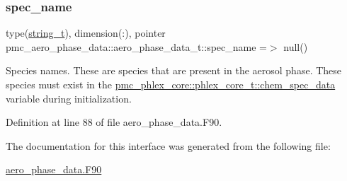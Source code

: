 \subsubsection{\texorpdfstring{spec\+\_\+name}{spec\_name}}
{\footnotesize\ttfamily type(\mbox{\hyperlink{structpmc__util_1_1string__t}{string\+\_\+t}}), dimension(\+:), pointer pmc\+\_\+aero\+\_\+phase\+\_\+data\+::aero\+\_\+phase\+\_\+data\+\_\+t\+::spec\+\_\+name =$>$ null()\hspace{0.3cm}{\ttfamily [private]}}



Species names. These are species that are present in the aerosol phase. These species must exist in the {\ttfamily \mbox{\hyperlink{structpmc__phlex__core_1_1phlex__core__t_aff3bb5cb12638af6de6ee3b8b65a1fb3}{pmc\+\_\+phlex\+\_\+core\+::phlex\+\_\+core\+\_\+t\+::chem\+\_\+spec\+\_\+data}}} variable during initialization. 



Definition at line 88 of file aero\+\_\+phase\+\_\+data.\+F90.



The documentation for this interface was generated from the following file\+:\begin{DoxyCompactItemize}
\item 
\mbox{\hyperlink{aero__phase__data_8_f90}{aero\+\_\+phase\+\_\+data.\+F90}}\end{DoxyCompactItemize}
